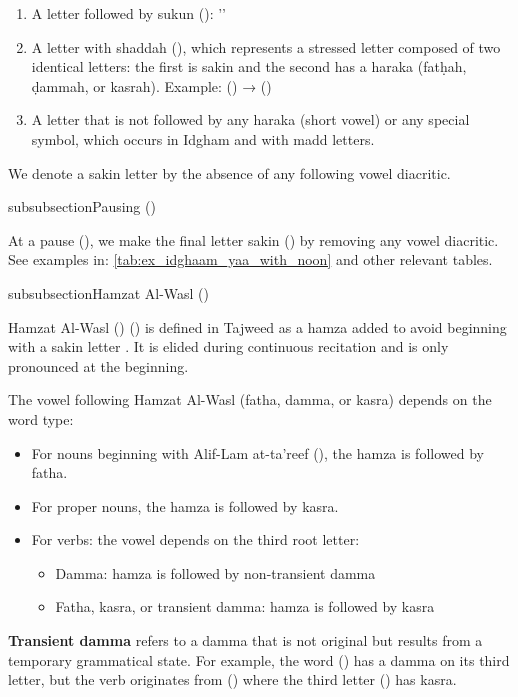 \begin{enumerate}
	\item A letter followed by sukun (): ''
	\item A letter with shaddah (), which represents a stressed letter composed of two identical letters: the first is sakin and the second has a haraka (fatḥah, ḍammah, or kasrah). Example: () → ()
	\item A letter that is not followed by any haraka (short vowel) or any special symbol, which occurs in Idgham and with madd letters.
\end{enumerate}

We denote a sakin letter by the absence of any following vowel diacritic.

subsubsection{Pausing ()}

At a pause (), we make the final letter sakin () by removing any vowel diacritic. See examples in: \ref{tab:ex_idghaam_yaa_with_noon} and other relevant tables.

subsubsection{Hamzat Al-Wasl ()}

Hamzat Al-Wasl () () is defined in Tajweed as a hamza added to avoid beginning with a sakin letter \cite{sweed2021}. It is elided during continuous recitation and is only pronounced at the beginning.

The vowel following Hamzat Al-Wasl (fatha, damma, or kasra) depends on the word type:

\begin{itemize}
	\item For nouns beginning with Alif-Lam at-ta'reef (), the hamza is followed by fatha.
	\item For proper nouns, the hamza is followed by kasra.
	\item For verbs: the vowel depends on the third root letter:
	      \begin{itemize}
		      \item Damma: hamza is followed by non-transient damma
		      \item Fatha, kasra, or transient damma: hamza is followed by kasra
	      \end{itemize}
\end{itemize}

\textbf{Transient damma} refers to a damma that is not original but results from a temporary grammatical state. For example, the word () has a damma on its third letter, but the verb originates from () where the third letter () has kasra.

